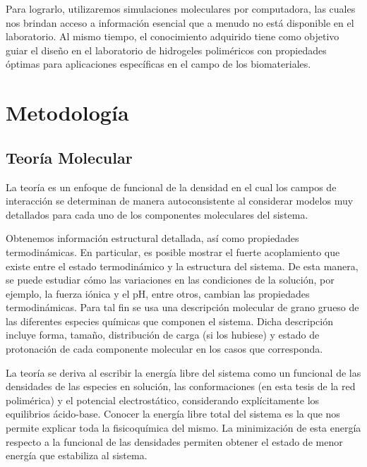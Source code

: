 Para lograrlo, utilizaremos simulaciones moleculares por computadora, las cuales nos brindan acceso a informaci\'on esencial que a menudo no est\'a disponible en el laboratorio. Al mismo tiempo, el conocimiento adquirido tiene como objetivo guiar el dise\~no en el laboratorio de hidrogeles polim\'ericos con propiedades \'optimas para aplicaciones espec\'ificas en el campo de los biomateriales.



\section{Metodolog\'ia}

\subsection{Teor\'ia Molecular}

La teor\'ia es un enfoque de funcional de la densidad en el cual los campos de interacción se determinan de manera autoconsistente al considerar modelos muy detallados para cada uno de los componentes moleculares del sistema.

Obtenemos informaci\'on estructural detallada, as\'i como propiedades termodin\'amicas. En particular, es posible mostrar el fuerte acoplamiento que existe entre el estado termodin\'amico y la estructura del sistema. De esta manera, se puede estudiar c\'omo las variaciones en las condiciones de la soluci\'on, por ejemplo, la fuerza i\'onica y el pH, entre otros, cambian las propiedades termodin\'amicas.
Para tal fin se usa una descripci\'on molecular de grano grueso de las diferentes especies qu\'imicas que componen el sistema. Dicha descripci\'on incluye forma, tama\~no, distribuci\'on de carga (si los hubiese) y estado de protonaci\'on de cada componente molecular en los casos que corresponda.

La teor\'ia se deriva al escribir la energía libre del sistema como un funcional de las densidades de las especies en soluci\'on, las conformaciones (en esta tesis de la red polim\'erica) y el potencial electrost\'atico, considerando expl\'icitamente los equilibrios \'acido-base.
Conocer la energ\'ia libre total del sistema es la que nos permite explicar toda la fisicoqu\'imica del mismo. La minimizaci\'on de esta energ\'ia respecto a la funcional de las densidades permiten obtener el estado de menor energ\'ia que estabiliza al sistema.


